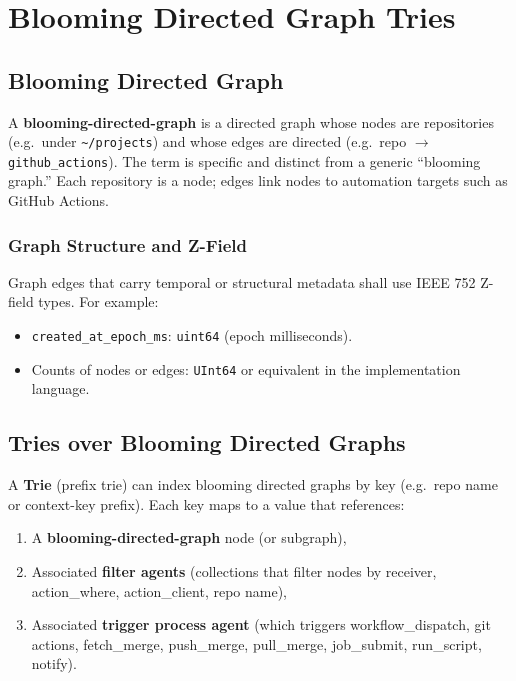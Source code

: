 \chapter{Blooming Directed Graph Tries}
\label{ch:blooming-directed-graph-tries}

\section{Blooming Directed Graph}

A \textbf{blooming-directed-graph} is a directed graph whose nodes are repositories (e.g.\ under \texttt{\textasciitilde/projects}) and whose edges are directed (e.g.\ repo \(\to\) \texttt{github\_actions}). The term is specific and distinct from a generic ``blooming graph.'' Each repository is a node; edges link nodes to automation targets such as GitHub Actions.

\subsection{Graph Structure and Z-Field}

Graph edges that carry temporal or structural metadata shall use IEEE 752 Z-field types. For example:

\begin{itemize}
    \item \texttt{created\_at\_epoch\_ms}: \texttt{uint64} (epoch milliseconds).
    \item Counts of nodes or edges: \texttt{UInt64} or equivalent in the implementation language.
\end{itemize}

\section{Tries over Blooming Directed Graphs}

A \textbf{Trie} (prefix trie) can index blooming directed graphs by key (e.g.\ repo name or context-key prefix). Each key maps to a value that references:

\begin{enumerate}
    \item A \textbf{blooming-directed-graph} node (or subgraph),
    \item Associated \textbf{filter agents} (collections that filter nodes by receiver, action\_where, action\_client, repo name),
    \item Associated \textbf{trigger process agent} (which triggers workflow\_dispatch, git actions, fetch\_merge, push\_merge, pull\_merge, job\_submit, run\_script, notify).
\end{enumerate}

